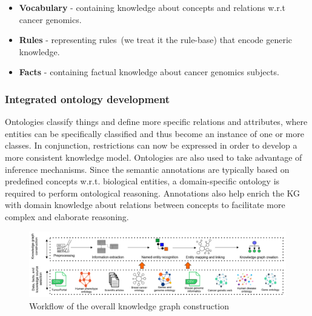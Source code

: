\vspace{-2mm}
\begin{itemize}[noitemsep]
    \item \textbf{Vocabulary} - containing knowledge about concepts and relations w.r.t cancer genomics. 
    \item \textbf{Rules} - representing rules~(we treat it the rule-base) that encode generic knowledge. 
    \item \textbf{Facts} - containing factual knowledge about cancer genomics subjects.
    \vspace{-4mm}
\end{itemize}

\subsubsection{Integrated ontology development}
Ontologies classify things and define more specific relations and attributes, where entities can be specifically classified and thus become an instance of one or more classes. In conjunction, restrictions can now be expressed in order to develop a more consistent knowledge model. Ontologies are also used to take advantage of inference mechanisms. Since the semantic annotations are typically based on predefined concepts w.r.t. biological entities, a domain-specific ontology is required to perform ontological reasoning. Annotations also help enrich the KG with domain knowledge about relations between concepts to facilitate more complex and elaborate reasoning. 

\begin{figure}
	\centering
	\includegraphics[scale=0.7]{images/KG_construction_steps.png}
	\caption{Workflow of the overall knowledge graph construction} 
	\label{fig:kg_creation}
	\vspace{-2mm}
\end{figure} 

